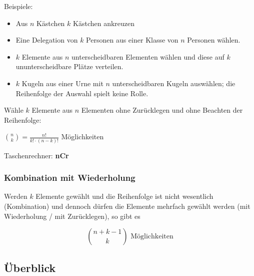 \begin{multicols}{2}
Beispiele:

\begin{itemize}
\item Aus $n$ Kästchen $k$ Kästchen ankreuzen
\item Eine Delegation von $k$ Personen aus einer Klasse von $n$
Personen wählen.
\item $k$ Elemente aus $n$ unterscheidbaren Elementen wählen und diese
auf $k$ ununterscheidbare Plätze verteilen.
\item $k$ Kugeln aus einer Urne mit $n$ unterscheidbaren Kugeln
auswählen; die Reihenfolge der Auswahl spielt keine Rolle.
\end{itemize}

Wähle $k$ Elemente aus $n$ Elementen ohne Zurücklegen und ohne
Beachten der Reihenfolge:

 ${n\choose k} = \frac{n!}{k!\cdot{}(n-k)!}$ Möglichkeiten

Taschenrechner: \textbf{nCr}

\subsubsection{Kombination mit Wiederholung}
Werden $k$ Elemente gewählt und die Reihenfolge ist nicht wesentlich
(Kombination) und dennoch dürfen die Elemente mehrfach gewählt werden
(mit Wiederholung / mit Zurücklegen), so gibt es

$${n+k-1 \choose k} \textrm { Möglichkeiten}$$ 



\end{multicols}




\subsection*{Überblick}
\hrulefill


